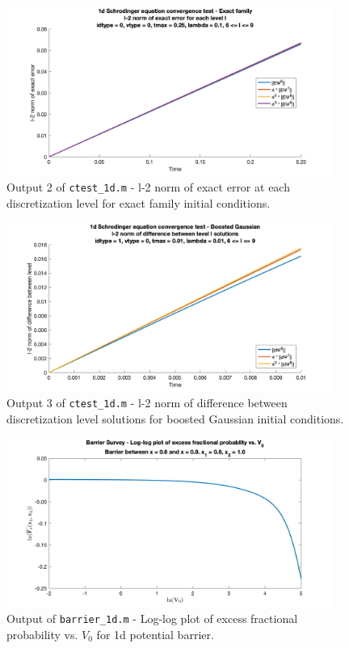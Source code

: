 \documentclass[10pt]{article}
\def\code#1{\texttt{#1}} %
\begin{document}
\begin{figure}[H]
\centering
\includegraphics[width=0.95\textwidth]{problem1/ctest_1d-2.png}
\caption{Output 2 of \code{ctest\_1d.m} - 
l-2 norm of exact error at each discretization level for exact family initial conditions.}
\end{figure}

\begin{figure}[H]
\centering
\includegraphics[width=0.95\textwidth]{problem1/ctest_1d-3.png}
\caption{Output 3 of \code{ctest\_1d.m} - 
l-2 norm of difference between discretization level solutions for boosted Gaussian initial 
conditions.}
\end{figure}


\begin{figure}[H]
\centering
\includegraphics[width=0.95\textwidth]{problem1/barrier_1d.png}
\caption{Output of \code{barrier\_1d.m} - 
Log-log plot of excess fractional probability vs. $V_0$ for 1d potential barrier.}
\end{figure}
\end{document}
